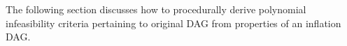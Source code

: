 {The following section discusses how to procedurally derive polynomial infeasibility criteria pertaining to original DAG from properties of an inflation DAG. 



}
